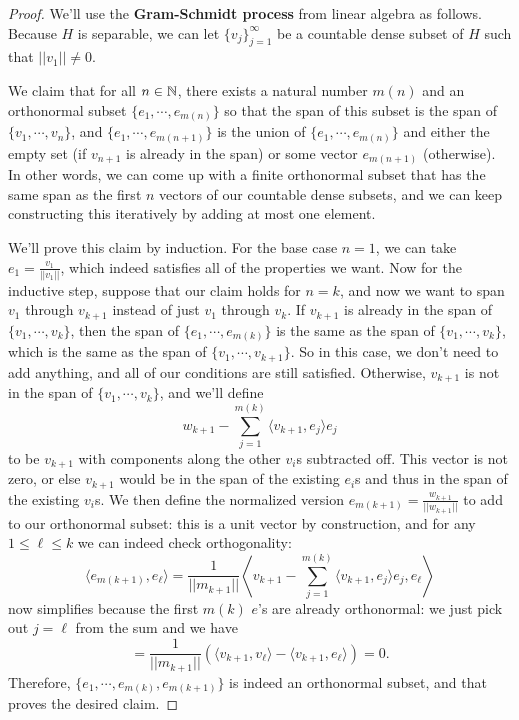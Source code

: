 \begin{proof}
We'll use the \textbf{Gram-Schmidt process} from linear algebra as follows. Because $H$ is separable, we can let $\{v_j\}_{j=1}^{\infty}$ be a countable dense subset of $H$ such that $||v_1|| \ne 0$. 

We claim that for all $n \in \mathbb N$, there exists a natural number $m(n)$ and an orthonormal subset $\{e_1, \cdots, e_{m(n)}\}$ so that the span of this subset is the span of $\{v_1, \cdots, v_n\}$, and $\{e_1, \cdots, e_{m(n+1)}\}$ is the union of $\{e_1, \cdots, e_{m(n)}\}$ and either the empty set (if $v_{n+1}$ is already in the span) or some vector $e_{m(n+1)}$ (otherwise). In other words, we can come up with a finite orthonormal subset that has the same span as the first $n$ vectors of our countable dense subsets, and we can keep constructing this iteratively by adding at most one element. 

We'll prove this claim by induction. For the base case $n = 1$, we can take $e_1 = \frac{v_1}{||v_1||}$, which indeed satisfies all of the properties we want. Now for the inductive step, suppose that our claim holds for $n = k$, and now we want to span $v_1$ through $v_{k+1}$ instead of just $v_1$ through $v_k$. If $v_{k+1}$ is already in the span of $\{v_1, \cdots, v_k\}$, then the span of $\{e_1, \cdots, e_{m(k)}\}$ is the same as the span of $\{v_1, \cdots, v_k\}$, which is the same as the span of $\{v_1, \cdots, v_{k+1}\}$. So in this case, we don't need to add anything, and all of our conditions are still satisfied. Otherwise, $v_{k+1}$ is not in the span of $\{v_1, \cdots, v_k\}$, and we'll define
\[
    w_{k+1} - \sum_{j=1}^{m(k)} \langle v_{k+1}, e_j \rangle e_j
\]
to be $v_{k+1}$ with components along the other $v_i$s subtracted off. This vector is not zero, or else $v_{k+1}$ would be in the span of the existing $e_i$s and thus in the span of the existing $v_i$s. We then define the normalized version $e_{m(k+1)} = \frac{w_{k+1}}{||w_{k+1}||}$ to add to our orthonormal subset: this is a unit vector by construction, and for any $1 \le \ell \le k$ we can indeed check orthogonality:
\[
    \langle e_{m(k+1)}, e_\ell \rangle = \frac{1}{||m_{k+1}||} \left\langle v_{k+1} - \sum_{j=1}^{m(k)} \langle v_{k+1}, e_j \rangle e_j, e_\ell \right\rangle
\]
now simplifies because the first $m(k)$ $e$'s are already orthonormal: we just pick out $j = \ell$ from the sum and we have
\[
    = \frac{1}{||m_{k+1}||} \left(\langle v_{k+1}, v_\ell \rangle - \langle v_{k+1}, e_\ell \rangle \right) = 0.
\]  
Therefore, $\{e_1, \cdots, e_{m(k)}, e_{m(k+1)}\}$ is indeed an orthonormal subset, and that proves the desired claim.


\end{proof}
